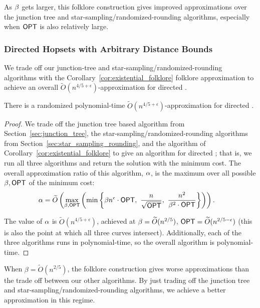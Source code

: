As $\beta$ gets larger, this folklore construction gives improved approximations over the junction tree and star-sampling/randomized-rounding algorithms, especially when ${\sf OPT}$ is also relatively large. 


\subsubsection{Directed Hopsets with Arbitrary Distance Bounds}
We trade off our junction-tree and star-sampling/randomized-rounding algorithms with the Corollary~\ref{cor:existential_folklore} folklore approximation to achieve an overall $\widetilde{O}(n^{4/5 + \epsilon})$-approximation for directed {\hopset}. 

\begin{theorem} \label{thm:main_result}
    There is a randomized  polynomial-time $\widetilde{O}(n^{4/5 + \epsilon})$-approximation for directed {\hopset}.
\end{theorem}
\begin{proof}
    We trade off the junction tree based algorithm from Section~\ref{sec:junction_tree}, the star-sampling/randomized-rounding algorithms from Section~\ref{sec:star_sampling_rounding}, and the algorithm of Corollary~\ref{cor:existential_folklore} to give an algorithm for directed {\hopset}; that is, we run all three algorithms and return the solution with the minimum cost. The overall approximation ratio of this algorithm, $\alpha$, is the maximum over all possible $\beta, {\sf OPT}$ of the minimum cost:
    \begin{align*}
        \alpha &= \widetilde{O}\left( \max_{\beta, {{\sf OPT}}} \left( \min_{} \left\{ \beta n^\epsilon \cdot {{\sf OPT}}, \mbox{ } \frac{n}{\sqrt{{{\sf OPT}}}}, \mbox{ }\frac{n^2}{\beta^2 \cdot {{\sf OPT}}}  \right\} \right) \right).                    
    \end{align*}
    
    The value of $\alpha$ is $\widetilde{O}(n^{4/5+\epsilon})$, achieved at $\beta = \widetilde{O}(n^{2/5})$, ${{\sf OPT}} = \widetilde{O}(n^{2/5 - \epsilon})$ (this is also the point at which all three curves intersect). Additionally, each of the three algorithms runs in polynomial-time, so the overall algorithm is polynomial-time.
\end{proof}


When $\beta = \widetilde{O}(n^{2/5})$, the folklore construction gives worse approximations than the trade off between our other algorithms. By just trading off the junction tree and star-sampling/randomized-rounding algorithms, we achieve a better approximation in this regime.

